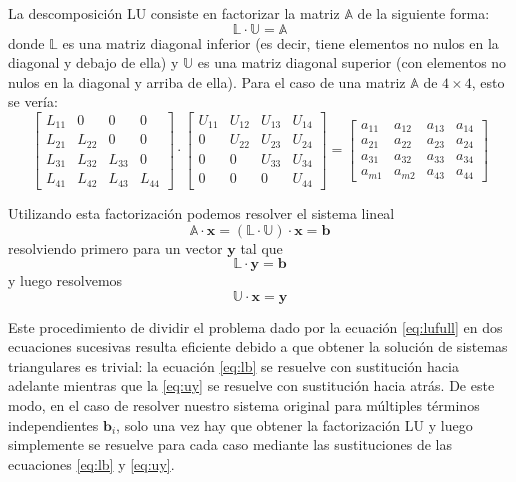 La descomposición LU consiste en factorizar la matriz $\mathbb{A}$ de la siguiente forma:
\begin{equation}
 \mathbb{L} \cdot \mathbb{U} =\mathbb{A}
\end{equation} 
donde $\mathbb{L}$ es una matriz diagonal inferior (es decir, tiene elementos no nulos en la diagonal y debajo de ella) y $\mathbb{U}$ es una matriz diagonal superior (con elementos no nulos en la diagonal y arriba de ella). Para el caso de una matriz $\mathbb{A}$ de $4 \times 4$, esto se vería:
\begin{equation}
 \begin{bmatrix}
  L_{11} & 0 & 0 & 0 \\
  L_{21} & L_{22} & 0 & 0 \\
  L_{31} & L_{32} & L_{33} & 0 \\
  L_{41} & L_{42} & L_{43} & L_{44} 
 \end{bmatrix} \cdot
 \begin{bmatrix}
  U_{11} & U_{12} & U_{13} & U_{14} \\
  0 & U_{22} & U_{23} & U_{24} \\
  0 & 0 & U_{33} & U_{34} \\
  0 & 0 & 0 & U_{44} 
 \end{bmatrix} =
  \begin{bmatrix}
  a_{11} & a_{12} & a_{13} & a_{14}  \\
  a_{21} & a_{22} & a_{23} & a_{24}  \\
  a_{31} & a_{32} & a_{33} & a_{34}  \\
  a_{m1} & a_{m2} & a_{43} & a_{44}  
 \end{bmatrix}
\end{equation} 

Utilizando esta factorización podemos resolver el sistema lineal
\begin{equation}\label{eq:lufull}
 \mathbb{A} \cdot \bm{x} = (\mathbb{L} \cdot \mathbb{U}) \cdot \bm{x} = \bm{b}
\end{equation} 
resolviendo primero para un vector $\bm{y}$ tal que
\begin{equation}\label{eq:lb}
 \mathbb{L} \cdot \bm{y} = \bm{b}
\end{equation}
y luego resolvemos
\begin{equation}\label{eq:uy}
 \mathbb{U} \cdot \bm{x} = \bm{y}
\end{equation}

Este procedimiento de dividir el problema dado por la ecuación \eqref{eq:lufull} en dos ecuaciones sucesivas resulta eficiente debido a que obtener la solución de sistemas triangulares es trivial: la ecuación \eqref{eq:lb} se resuelve con sustitución hacia adelante mientras que la \eqref{eq:uy} se resuelve con sustitución hacia atrás. De este modo, en el caso de resolver nuestro sistema original para múltiples términos independientes $\bm{b}_i$, solo una vez hay que obtener la factorización LU y luego simplemente se resuelve para cada caso mediante las sustituciones de las ecuaciones \eqref{eq:lb} y \eqref{eq:uy}.

